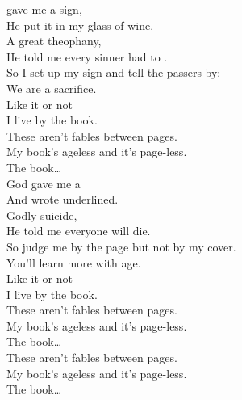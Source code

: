 
 gave me a sign, \\
He put it in my glass of wine. \\
A great theophany, \\
He told me every sinner had to . \\
So I set up my sign and tell the passers-by: \\
We are a sacrifice. \\
Like it or not \\
I live by the book. \\

These aren't fables between pages. \\
My book's ageless and it's page-less. \\

The book… \\

God gave me a  \\
And wrote  underlined. \\
Godly suicide, \\
He told me everyone will die. \\
So judge me by the page but not by my cover. \\
You'll learn more with age. \\
Like it or not \\
I live by the book. \\

These aren't fables between pages. \\
My book's ageless and it's page-less. \\

The book… \\

These aren't fables between pages. \\
My book's ageless and it's page-less. \\

The book… \\







